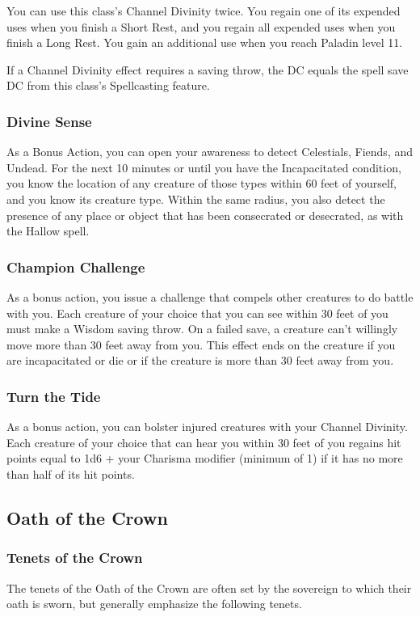 \documentclass[letterpaper,openany,oneside,twocolumn]{book}
\begin{document}
You can use this class's Channel Divinity twice. You regain one of its expended uses when you finish a Short Rest, and you regain all expended uses when you finish a Long Rest. You gain an additional use when you reach Paladin level 11.

If a Channel Divinity effect requires a saving throw, the DC equals the spell save DC from this class's Spellcasting feature.
\subsubsection*{Divine Sense}
As a Bonus Action, you can open your awareness to detect Celestials, Fiends, and Undead. For the next 10 minutes or until you have the Incapacitated condition, you know the location of any creature of those types within 60 feet of yourself, and you know its creature type. Within the same radius, you also detect the presence of any place or object that has been consecrated or desecrated, as with the Hallow spell.
\subsubsection*{Champion Challenge}
As a bonus action, you issue a challenge that compels other creatures to do battle with you. Each creature of your choice that you can see within 30 feet of you must make a Wisdom saving throw. On a failed save, a creature can't willingly move more than 30 feet away from you. This effect ends on the creature if you are incapacitated or die or if the creature is more than 30 feet away from you.
\subsubsection*{Turn the Tide}
As a bonus action, you can bolster injured creatures with your Channel Divinity. Each creature of your choice that can hear you within 30 feet of you regains hit points equal to 1d6 + your Charisma modifier (minimum of 1) if it has no more than half of its hit points.
\subsection*{Oath of the Crown}
\subsubsection*{Tenets of the Crown}
The tenets of the Oath of the Crown are often set by the sovereign to which their oath is sworn, but generally emphasize the following tenets.
\end{document}
